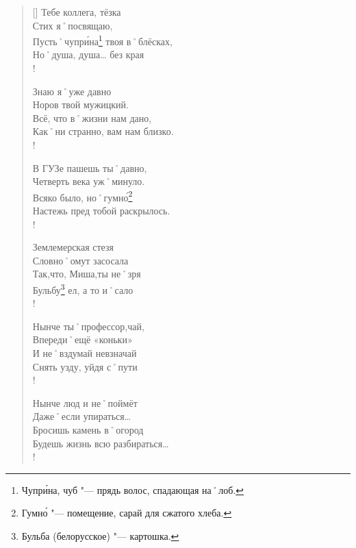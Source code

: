 \pagebreak							%

\clearpage							%
\begin{verse}[\versewidth]
Тебе коллега, тёзка           \\
Стих я˚посвящаю,               \\
Пусть˚чупр\'{и}на\footnote{Чупр\'{и}на, чуб "--- прядь волос, спадающая на˚лоб.} твоя в˚блёсках, \\
Но˚душа, душа… без края \\!

\vin Знаю я˚уже давно               \\						%
\vin Норов твой мужицкий.            \\
\vin Всё, что в˚жизни нам дано,      \\
\vin Как˚ни странно, вам нам близко. \\!

В ГУЗе пашешь ты˚давно,         \\
Четверть века уж˚минуло.        \\
Всяко было, но˚гумн\'{о}\footnote{Гумн\'{о} "--- помещение, сарай для сжатого хлеба.}           \\
Настежь пред тобой раскрылось. \\!

\vin Землемерская стезя             \\
\vin Словно˚омут засосала           \\
\vin Так,что, Миша,ты не˚зря        \\
\vin Бульбу\footnote{Бульба (белорусское) "--- картошка.} ел, а то и˚сало \\!

Нынче ты˚профессор,чай,        \\
Впереди˚ещё «коньки»             \\
И не˚вздумай невзначай         \\
Снять узду, уйдя с˚пути  				\\!

\vin Нынче люд и не˚поймёт          \\
\vin Даже˚если упираться…         \\
\vin Бросишь камень в˚огород        \\
\vin Будешь жизнь всю разбираться… \\!


\end{verse}
